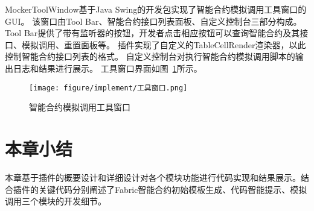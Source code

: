 MockerToolWindow基于Java Swing的开发包实现了智能合约模拟调用工具窗口的GUI。
该窗口由Tool Bar、智能合约接口列表面板、自定义控制台三部分构成。
Tool Bar提供了带有监听器的按钮，开发者点击相应按钮可以查询智能合约及其接口、模拟调用、重置面板等。
插件实现了自定义的TableCellRender渲染器，以此控制智能合约接口列表的格式。
自定义控制台对执行智能合约模拟调用脚本的输出日志和结果进行展示。
工具窗口界面如图~\ref{fig:5.21}所示。

\begin{figure}[htb]
  \centering
  \texttt{[image: figure/implement/工具窗口.png]}
  \caption{智能合约模拟调用工具窗口}\label{fig:5.21}
\end{figure}

\section{本章小结}

本章基于插件的概要设计和详细设计对各个模块功能进行代码实现和结果展示。结合插件的关键代码分别阐述了Fabric智能合约初始模板生成、代码智能提示、模拟调用三个模块的开发细节。

